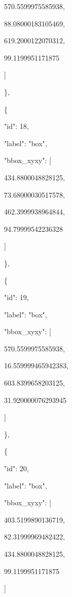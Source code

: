 \documentclass[10pt,a4paper]{article}
\begin{document}
        570.5599975585938,\allowbreak{}\par
        88.08000183105469,\allowbreak{}\par
        619.2000122070312,\allowbreak{}\par
        99.1199951171875\par
      ]\par
    \},\allowbreak{}\par
    \{\par
      "id":\allowbreak{} 18,\allowbreak{}\par
      "label":\allowbreak{} "box",\allowbreak{}\par
      "bbox\_xyxy":\allowbreak{} [\par
        434.8800048828125,\allowbreak{}\par
        73.68000030517578,\allowbreak{}\par
        462.3999938964844,\allowbreak{}\par
        94.79999542236328\par
      ]\par
    \},\allowbreak{}\par
    \{\par
      "id":\allowbreak{} 19,\allowbreak{}\par
      "label":\allowbreak{} "box",\allowbreak{}\par
      "bbox\_xyxy":\allowbreak{} [\par
        570.5599975585938,\allowbreak{}\par
        16.559999465942383,\allowbreak{}\par
        603.8399658203125,\allowbreak{}\par
        31.920000076293945\par
      ]\par
    \},\allowbreak{}\par
    \{\par
      "id":\allowbreak{} 20,\allowbreak{}\par
      "label":\allowbreak{} "box",\allowbreak{}\par
      "bbox\_xyxy":\allowbreak{} [\par
        403.5199890136719,\allowbreak{}\par
        82.31999969482422,\allowbreak{}\par
        434.8800048828125,\allowbreak{}\par
        99.1199951171875\par
      ]\par
\end{document}
